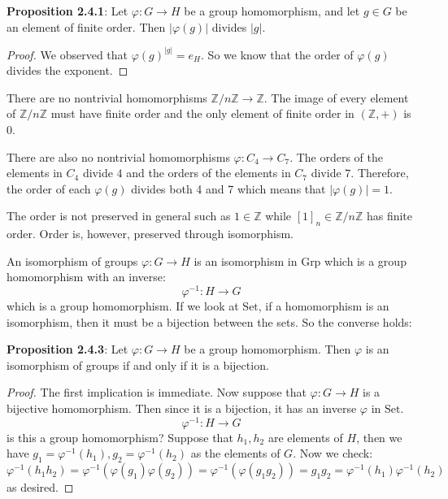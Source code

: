 \documentclass{report}
\begin{document}
\textbf{Proposition 2.4.1}: Let $\varphi: G \rightarrow H$ be a group homomorphism, and let $g \in G$ be an element of finite order. Then $\lvert \varphi(g) \rvert$ divides $\lvert g \rvert$.
    \begin{proof}
        We observed that $\varphi(g)^{\lvert g \rvert} = e_{H}$. So we know that the order of $\varphi(g)$ divides the exponent.
    \end{proof}

\begin{examples}
    \begin{example}[\label{exm:2.4.2}]
        There are no nontrivial homomorphisms $\mathbb{Z}/n\mathbb{Z} \rightarrow \mathbb{Z}$. The image of every element of $\mathbb{Z}/n\mathbb{Z}$ must have finite order and the only element of finite order in $(\mathbb{Z}, +)$ is 0.

        There are also no nontrivial homomorphisms $\varphi: C_{4} \rightarrow C_{7}$. The orders of the elements in $C_{4}$ divide $4$ and the orders of the elements in $C_{7}$ divide $7$. Therefore, the order of each $\varphi(g)$ divides both 4 and 7 which means that $\lvert \varphi(g) \rvert = 1$.

        The order is not preserved in general such as $1 \in \mathbb{Z}$ while $[1]_{n} \in \mathbb{Z}/n\mathbb{Z}$ has finite order. Order is, however, preserved through isomorphism.
    \end{example}
\end{examples}

An isomorphism of groups $\varphi: G \rightarrow H$ is an isomorphism in $\text{Grp}$ which is a group homomorphism with an inverse:
    \begin{equation*}
        \varphi^{-1} : H \rightarrow G
    \end{equation*}
which is a group homomorphism. If we look at $\text{Set}$, if a homomorphism is an isomorphism, then it must be a bijection between the sets. So the converse holds:

\textbf{Proposition 2.4.3}: Let $\varphi : G \rightarrow H$ be a group homomorphism. Then $\varphi$ is an isomorphism of groups if and only if it is a bijection.
    \begin{proof}
        The first implication is immediate. Now suppose that $\varphi : G \rightarrow H$ is a bijective homomorphism. Then since it is a bijection, it has an inverse $\varphi$ in $\text{Set}$.
            \begin{equation*}
                \varphi^{-1} : H \rightarrow G
            \end{equation*}
        is this a group homomorphism? Suppose that $h_{1}, h_{2}$ are elements of $H$, then we have $g_{1} = \varphi^{-1}(h_{1}), g_{2} = \varphi^{-1}(h_{2})$ as the elements of $G$. Now we check:
            \begin{equation*}
                \varphi^{-1}(h_{1}h_{2}) = \varphi^{-1}(\varphi(g_{1})\varphi(g_{2})) = \varphi^{-1}(\varphi(g_{1}g_{2})) = g_{1}g_{2} = \varphi^{-1}(h_{1}) \varphi^{-1}(h_{2})
            \end{equation*}
        as desired.
    \end{proof}
\end{document}
